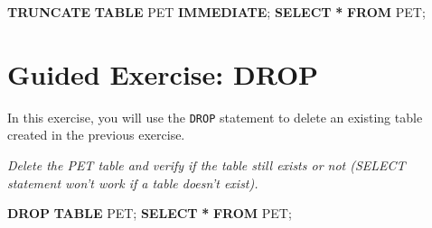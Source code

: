 \documentclass[
]{book}
\newenvironment{Shaded}{\begin{snugshade}}{\end{snugshade}}
\newcommand{\KeywordTok}[1]{\textcolor[rgb]{0.13,0.29,0.53}{\textbf{#1}}}
\newcommand{\NormalTok}[1]{#1}
\newcommand{\OperatorTok}[1]{\textcolor[rgb]{0.81,0.36,0.00}{\textbf{#1}}}
\begin{document}
\begin{Shaded}
\begin{Highlighting}[]
\KeywordTok{TRUNCATE} \KeywordTok{TABLE}\NormalTok{ PET }\KeywordTok{IMMEDIATE}\NormalTok{;}
\KeywordTok{SELECT} \OperatorTok{*} \KeywordTok{FROM}\NormalTok{ PET;}
\end{Highlighting}
\end{Shaded}

\hypertarget{guided-exercise-drop}{%
\section{Guided Exercise: DROP}\label{guided-exercise-drop}}

In this exercise, you will use the \texttt{DROP} statement to delete an existing table created in the previous exercise.

{\emph{Delete the PET table and verify if the table still exists or not (SELECT statement won't work if a table doesn't exist).
}}

\begin{Shaded}
\begin{Highlighting}[]
\KeywordTok{DROP} \KeywordTok{TABLE}\NormalTok{ PET;}
\KeywordTok{SELECT} \OperatorTok{*} \KeywordTok{FROM}\NormalTok{ PET;}
\end{Highlighting}
\end{Shaded}


  
\end{document}
